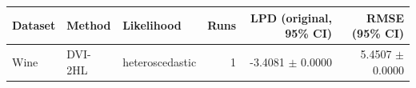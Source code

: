 \begin{tabular}{lllrrr}
\toprule
Dataset & Method & Likelihood & Runs & LPD (original, 95\% CI) & RMSE (95\% CI) \\
\midrule
Wine & DVI-2HL & heteroscedastic & 1 & -3.4081 $\pm$ 0.0000 & 5.4507 $\pm$ 0.0000 \\
\bottomrule
\end{tabular}
